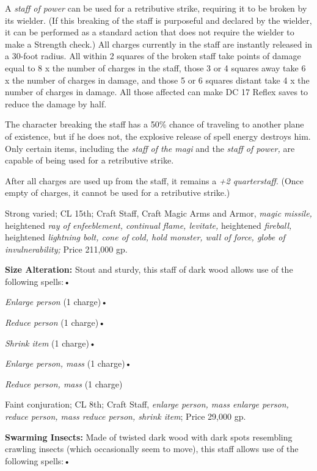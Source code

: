 \documentclass{article}
\begin{document}
A \textit{staff of power }can be used for a retributive strike, requiring it to 
be broken by its wielder. (If this breaking of the staff is purposeful and declared 
by the wielder, it can be performed as a standard action that does not require 
the wielder to make a Strength check.) All charges currently in the staff are instantly 
released in a 30-foot radius. All within 2 squares of the broken staff take points 
of damage equal to 8 x the number of charges in the staff, those 3 or 4 squares 
away take 6 x the number of charges in damage, and those 5 or 6 squares distant 
take 4 x the number of charges in damage. All those affected can make DC 17 Reflex 
saves to reduce the damage by half.

The character breaking the staff has a 50\% chance of traveling to another plane 
of existence, but if he does not, the explosive release of spell energy destroys 
him. Only certain items, including the \textit{staff of the magi} and the \textit{staff 
of power, }are capable of being used for a retributive strike.

After all charges are used up from the staff, it remains a \textit{+2 quarterstaff}. 
(Once empty of charges, it cannot be used for a retributive strike.)

Strong varied; CL 15th; Craft Staff, Craft Magic Arms and Armor, \textit{magic 
missile, }heightened \textit{ray of enfeeblement, continual flame, levitate, }heightened 
\textit{fireball, }heightened \textit{lightning bolt, cone of cold, hold monster, 
wall of force, globe of invulnerability; }Price 211,000 gp.

\textbf{Size Alteration:} Stout and sturdy, this staff of dark wood allows use 
of the following spells:• 

\textit{Enlarge person }(1 charge)• 

\textit{Reduce person }(1 charge)• 

\textit{Shrink item }(1 charge)• 

\textit{Enlarge person, mass }(1 charge)• 

\textit{Reduce person, mass }(1 charge)

Faint conjuration; CL 8th; Craft Staff, \textit{enlarge person, mass enlarge person, 
reduce person, mass reduce person, shrink item}; Price 29,000 gp.

\textbf{Swarming Insects:} Made of twisted dark wood with dark spots resembling 
crawling insects (which occasionally seem to move), this staff allows use of the 
following spells:• 
\end{document}

